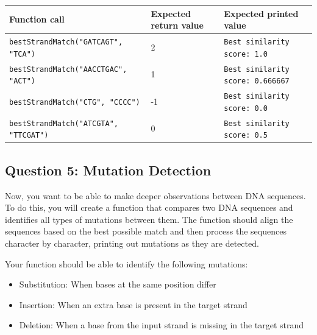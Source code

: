 \begin{sampleProject}
    \hspace{0pt}
    \begin{longtable}{|p{1.8in}|p{1.8in}|p{1.8in}|}
        \hline
        \textbf{Function call}
            & 
            \textbf{Expected return value}
            & 
            \textbf{Expected printed value}
            \\ \hline
        
        \texttt{bestStrandMatch("GATCAGT", "TCA")}
            & 
            2
            &
            \texttt{Best similarity score: 1.0}
            \\ \hline
        
        \texttt{bestStrandMatch("AACCTGAC", "ACT")}
            & 
            1
            &
            \texttt{Best similarity score: 0.666667}
            \\ \hline
        
        \texttt{bestStrandMatch("CTG", "CCCC")}
            & 
            -1
            &
            \texttt{Best similarity score: 0.0}
            \\ \hline

        \texttt{bestStrandMatch("ATCGTA", "TTCGAT")}
            & 
            0
            &
            \texttt{Best similarity score: 0.5}
            \\ \hline
    \end{longtable}
\end{sampleProject}


\subsection{Question 5: Mutation Detection}

Now, you want to be able to make deeper observations between DNA sequences. To do this, you will create a function that compares two DNA sequences and identifies all types of mutations between them. The function should align the sequences based on the best possible match and then process the sequences character by character, printing out mutations as they are detected.

Your function should be able to identify the following mutations:
\begin{itemize}[left=1cm]
    \item Substitution: When bases at the same position differ
    \item Insertion: When an extra base is present in the target strand
    \item Deletion: When a base from the input strand is missing in the target strand
\end{itemize}

